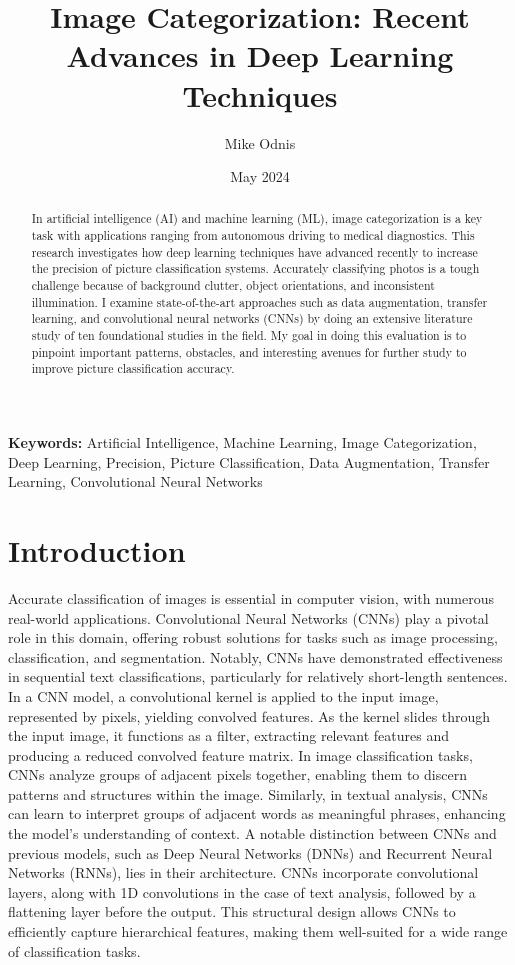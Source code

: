 \documentclass[journal]{IEEEtran}
\title{Image Categorization: Recent Advances in Deep Learning Techniques}
\author{Mike Odnis}
\date{May 2024}
\begin{document}
\maketitle

\begin{abstract}
In artificial intelligence (AI) and machine learning (ML), image categorization is a key task with applications ranging from autonomous driving to medical diagnostics. This research investigates how deep learning techniques have advanced recently to increase the precision of picture classification systems. Accurately classifying photos is a tough challenge because of background clutter, object orientations, and inconsistent illumination. I examine state-of-the-art approaches such as data augmentation, transfer learning, and convolutional neural networks (CNNs) by doing an extensive literature study of ten foundational studies in the field. My goal in doing this evaluation is to pinpoint important patterns, obstacles, and interesting avenues for further study to improve picture classification accuracy.
\end{abstract}

\textbf{Keywords:} Artificial Intelligence, Machine Learning, Image Categorization, Deep Learning, Precision, Picture Classification, Data Augmentation, Transfer Learning, Convolutional Neural Networks

\section{Introduction}
Accurate classification of images is essential in computer vision, with numerous real-world applications. Convolutional Neural Networks (CNNs) play a pivotal role in this domain, offering robust solutions for tasks such as image processing, classification, and segmentation. Notably, CNNs have demonstrated effectiveness in sequential text classifications, particularly for relatively short-length sentences. In a CNN model, a convolutional kernel is applied to the input image, represented by pixels, yielding convolved features. As the kernel slides through the input image, it functions as a filter, extracting relevant features and producing a reduced convolved feature matrix. In image classification tasks, CNNs analyze groups of adjacent pixels together, enabling them to discern patterns and structures within the image. Similarly, in textual analysis, CNNs can learn to interpret groups of adjacent words as meaningful phrases, enhancing the model's understanding of context. A notable distinction between CNNs and previous models, such as Deep Neural Networks (DNNs) and Recurrent Neural Networks (RNNs), lies in their architecture. CNNs incorporate convolutional layers, along with 1D convolutions in the case of text analysis, followed by a flattening layer before the output. This structural design allows CNNs to efficiently capture hierarchical features, making them well-suited for a wide range of classification tasks.
\end{document}
